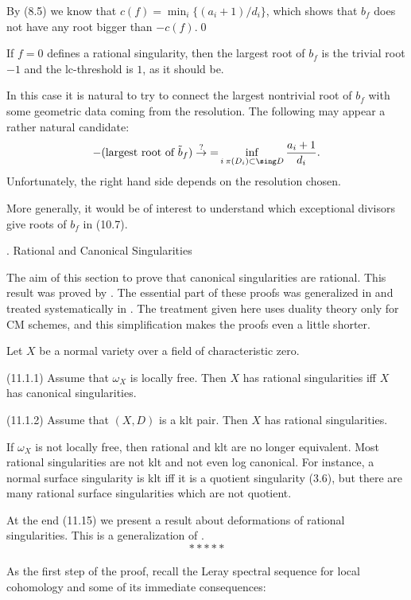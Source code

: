 By (8.5) we know that $c(f)=\min_i \{(a_i+1)/d_i\}$, which shows that
$b_f$ does not have any root   bigger than $-c(f)$.\qed\enddemo

 If $f=0$ defines  a rational singularity, then the largest
root of $b_f$ is the trivial root $-1$ and the lc-threshold is $1$, as it
should be.

In this case it is natural to try to connect the largest nontrivial root
of $b_f$ with some geometric data coming from the resolution. The following
may appear a rather natural candidate:
$$
-\text{(largest  root
of $\tilde b_f$)}\overset{?}\to{=}\inf_{i\: \pi(D_i)\subset \sing D}
\frac{a_i+1}{d_i}.
$$
Unfortunately, the right hand side depends on the resolution chosen.

More generally, it would be  of  interest to understand which exceptional
divisors give roots of  $b_f$ in (10.7). 
\enddemo




. Rational and Canonical Singularities
\endhead


The aim of this section to prove that canonical singularities are rational.
This result was proved by 
\cite{Elkik81; Flenner81}.
The essential part of these proofs was generalized in \cite{Fujita85} and 
treated   systematically in \cite{KaMaMa87, 1-3}.  The treatment given here  
uses duality theory only for CM schemes, and this simplification makes the
proofs even a little shorter. 

 Let $X$ be a normal variety over a field
of characteristic zero. 

(11.1.1) Assume that $\omega_X$  is locally free. 
  Then
$X$ has rational singularities iff $X$ has canonical singularities.

(11.1.2) Assume that $(X,D)$ is a klt pair.
  Then
$X$ has rational singularities.
\endproclaim

If $\omega_X$ is not locally free, then rational and klt are no longer
equivalent. 
Most rational singularities are not klt and not even log canonical. 
For instance, a normal surface singularity is klt iff it is a
quotient singularity (3.6), but there are many rational surface singularities
which are not quotient.
\enddemo


At the end (11.15) we present a result about deformations of rational
singularities. This is a generalization of \cite{Elkik78}. 
$$
*****
$$

 As the first step of the proof,  recall the
Leray spectral sequence for local cohomology and some of its immediate
consequences:


